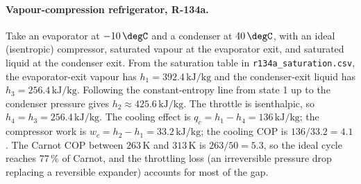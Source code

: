 \paragraph{Vapour-compression refrigerator, R-134a.} Take an
evaporator at $-10\,\degC$ and a condenser at $40\,\degC$, with an ideal
(isentropic) compressor, saturated vapour at the evaporator exit, and
saturated liquid at the condenser exit. From the saturation table in
\texttt{r134a\_saturation.csv}, the evaporator-exit vapour has $h_1 =
392.4\,\text{kJ}/\text{kg}$ and the condenser-exit liquid has $h_3 =
256.4\,\text{kJ}/\text{kg}$. Following the constant-entropy line from
state 1 up to the condenser pressure gives $h_2 \approx
425.6\,\text{kJ}/\text{kg}$. The throttle is isenthalpic, so $h_4 = h_3
= 256.4\,\text{kJ}/\text{kg}$. The cooling effect is $q_c = h_1 - h_4 =
136\,\text{kJ}/\text{kg}$; the compressor work is $w_c = h_2 - h_1 =
33.2\,\text{kJ}/\text{kg}$; the cooling COP is $136/33.2 = 4.1$. The
Carnot COP between $263\,\si{\kelvin}$ and $313\,\si{\kelvin}$ is
$263/50 = 5.3$, so the ideal cycle reaches $77\,\%$ of Carnot, and the
throttling loss (an irreversible pressure drop replacing a reversible
expander) accounts for most of the gap.

